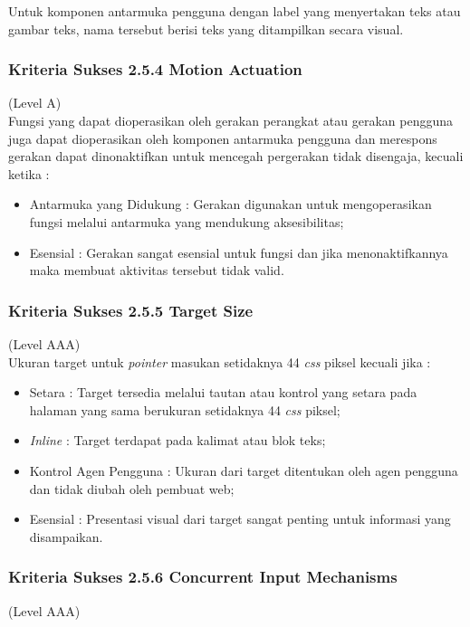 Untuk komponen antarmuka pengguna dengan label yang menyertakan teks atau gambar teks, nama tersebut berisi teks yang ditampilkan secara visual.

\subsubsection{Kriteria Sukses 2.5.4 Motion Actuation}
\label{subsubsec:kriteria_2.5.4}
(Level A) \\

Fungsi yang dapat dioperasikan oleh gerakan perangkat atau gerakan pengguna juga dapat dioperasikan oleh komponen antarmuka pengguna dan merespons gerakan dapat dinonaktifkan untuk mencegah pergerakan tidak disengaja, kecuali ketika :

\begin{itemize}
	\item Antarmuka yang Didukung : Gerakan digunakan untuk mengoperasikan fungsi melalui antarmuka yang mendukung aksesibilitas;
	\item Esensial : Gerakan sangat esensial untuk fungsi dan jika menonaktifkannya maka membuat aktivitas tersebut tidak valid.
\end{itemize}

\subsubsection{Kriteria Sukses 2.5.5 Target Size}
\label{subsubsec:kriteria_2.5.5}
(Level AAA) \\

Ukuran target untuk \textit{pointer} masukan setidaknya 44 \textit{css} piksel kecuali jika :

\begin{itemize}
	\item Setara : Target tersedia melalui tautan atau kontrol yang setara pada halaman yang sama berukuran setidaknya 44 \textit{css} piksel;
	\item \textit{Inline} : Target terdapat pada kalimat atau blok teks;
	\item Kontrol Agen Pengguna : Ukuran dari target ditentukan oleh agen pengguna dan tidak diubah oleh pembuat web;
	\item Esensial : Presentasi visual dari target sangat penting untuk informasi yang disampaikan.
\end{itemize}

\subsubsection{Kriteria Sukses 2.5.6 Concurrent Input Mechanisms}
\label{subsubsec:kriteria_2.5.6}
(Level AAA) \\

